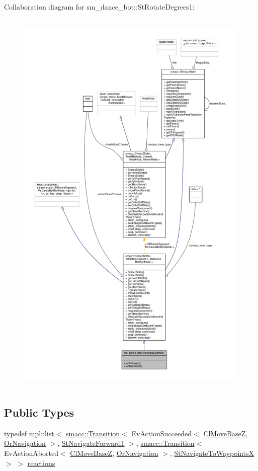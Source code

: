 Collaboration diagram for sm\+\_\+dance\+\_\+bot\+:\+:St\+Rotate\+Degrees1\+:\nopagebreak
\begin{figure}[H]
\begin{center}
\leavevmode
\includegraphics[height=550pt]{structsm__dance__bot_1_1StRotateDegrees1__coll__graph}
\end{center}
\end{figure}
\subsection*{Public Types}
\begin{DoxyCompactItemize}
\item 
typedef mpl\+::list$<$ \hyperlink{classsmacc_1_1Transition}{smacc\+::\+Transition}$<$ Ev\+Action\+Succeeded$<$ \hyperlink{classmove__base__z__client_1_1ClMoveBaseZ}{Cl\+Move\+BaseZ}, \hyperlink{classsm__dance__bot_1_1OrNavigation}{Or\+Navigation} $>$, \hyperlink{structsm__dance__bot_1_1StNavigateForward1}{St\+Navigate\+Forward1} $>$, \hyperlink{classsmacc_1_1Transition}{smacc\+::\+Transition}$<$ Ev\+Action\+Aborted$<$ \hyperlink{classmove__base__z__client_1_1ClMoveBaseZ}{Cl\+Move\+BaseZ}, \hyperlink{classsm__dance__bot_1_1OrNavigation}{Or\+Navigation} $>$, \hyperlink{structsm__dance__bot_1_1StNavigateToWaypointsX}{St\+Navigate\+To\+WaypointsX} $>$ $>$ \hyperlink{structsm__dance__bot_1_1StRotateDegrees1_aa7f3d798f5f408a14267e7c130a6a7e6}{reactions}
\end{DoxyCompactItemize}
